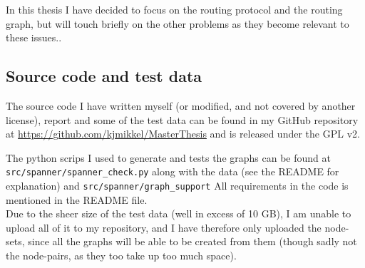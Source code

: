 In this thesis I have decided to focus on the routing protocol and the routing graph, but will touch briefly on the other problems as they become relevant to these issues..


\subsection{Source code and test data}
\label{section:source_code}
The source code I have written myself (or modified, and not covered by another license), report and some of the test data can be found in my GitHub repository at \url{https://github.com/kjmikkel/MasterThesis} and is released under the GPL v2.

The python scrips I used to generate and tests the graphs can be found at \texttt{src/spanner/spanner\_check.py} along with the data (see the README for explanation) and \texttt{src/spanner/graph\_support} All requirements in the code is mentioned in the README file.\\

Due to the sheer size of the test data (well in excess of 10 GB), I am unable to upload all of it to my repository, and I have therefore only uploaded the node-sets, since all the graphs will be able to be created from them (though sadly not the node-pairs, as they too take up too much space).

